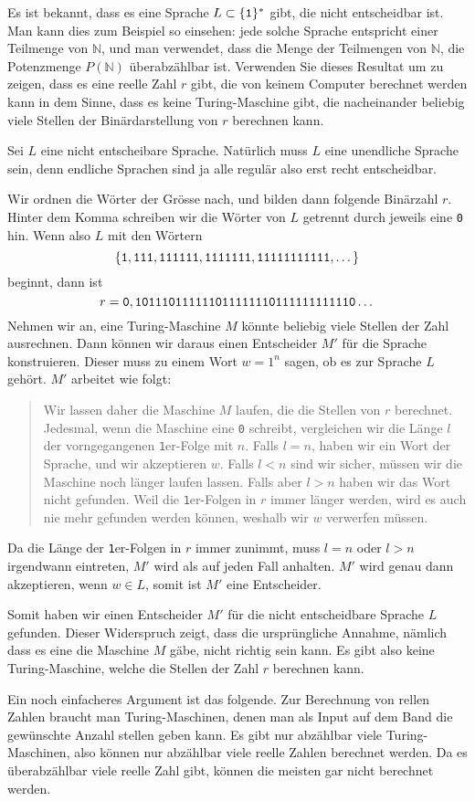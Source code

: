 Es ist bekannt, dass es eine Sprache
$L\subset \{\text{\tt 1}\}^*$ gibt, die nicht entscheidbar ist.
Man kann dies zum Beispiel so einsehen:
jede solche Sprache entspricht einer Teilmenge von $\mathbb N$,
und man verwendet, dass die Menge der Teilmengen von $\mathbb N$,
die Potenzmenge $P(\mathbb N)$ überabzählbar ist.
Verwenden Sie dieses
Resultat um zu zeigen, dass es eine reelle Zahl $r$ gibt, die von keinem
Computer berechnet werden kann in dem Sinne, dass es keine Turing-Maschine
gibt, die nacheinander beliebig viele Stellen der Binärdarstellung von $r$
berechnen
kann.


\begin{loesung}
Sei $L$ eine nicht entscheibare Sprache. Natürlich muss $L$ eine
unendliche Sprache sein, denn endliche Sprachen sind ja alle regulär
also erst recht entscheidbar.

Wir ordnen die Wörter der Grösse nach, und bilden dann folgende
Binärzahl $r$. Hinter dem Komma schreiben wir die Wörter von $L$
getrennt durch jeweils eine {\tt 0} hin. Wenn also $L$ mit
den Wörtern
\[
\{
\text{\tt 1},
\text{\tt 111},
\text{\tt 111111},
\text{\tt 1111111},
\text{\tt 11111111111},
\dots
\}
\]
beginnt, dann ist
\[
r=\text{\tt 0},\text{\tt 101110111111011111110111111111110}\dots
\]
Nehmen wir an, eine Turing-Maschine $M$ könnte beliebig viele Stellen
der Zahl ausrechnen. Dann können wir daraus einen Entscheider $M'$ für
die Sprache konstruieren. Dieser muss zu einem Wort $w=1^n$ sagen,
ob es zur Sprache $L$ gehört. $M'$ arbeitet wie folgt:

\begin{quote}
Wir lassen daher die Maschine $M$ laufen, die die Stellen von $r$ berechnet.
Jedesmal, wenn die Maschine eine
{\tt 0} schreibt, vergleichen wir die Länge $l$ der vorngegangenen
{\tt 1}er-Folge mit $n$. Falls $l=n$, haben wir ein Wort der Sprache,
und wir akzeptieren $w$. Falls $l<n$ sind wir sicher, müssen wir
die Maschine noch länger laufen lassen. Falls aber $l>n$ haben wir
das Wort nicht gefunden. Weil die {\tt 1}er-Folgen in $r$ immer
länger werden, wird es auch nie mehr gefunden werden können, weshalb
wir $w$ verwerfen müssen.
\end{quote}

Da die Länge der {\tt 1}er-Folgen in $r$ immer zunimmt, muss $l=n$
oder $l>n$ irgendwann eintreten, $M'$ wird als auf jeden Fall
anhalten. $M'$ wird genau dann akzeptieren, wenn $w\in L$, somit
ist $M'$ eine Entscheider.

Somit haben wir einen Entscheider $M'$ für die nicht entscheidbare Sprache
$L$ gefunden. Dieser Widerspruch zeigt, dass die ursprüngliche Annahme,
nämlich dass es eine die Maschine $M$ gäbe, nicht richtig sein kann.
Es gibt also keine Turing-Maschine, welche die Stellen der Zahl $r$ berechnen
kann.

Ein noch einfacheres Argument ist das folgende. Zur Berechnung von
rellen Zahlen braucht man Turing-Maschinen, denen man als Input auf
dem Band die gewünschte Anzahl stellen geben kann. Es gibt nur
abzählbar viele Turing-Maschinen, also können nur abzählbar viele
reelle Zahlen berechnet werden. Da es überabzählbar viele reelle
Zahl gibt, können die meisten gar nicht berechnet werden.
\end{loesung}
